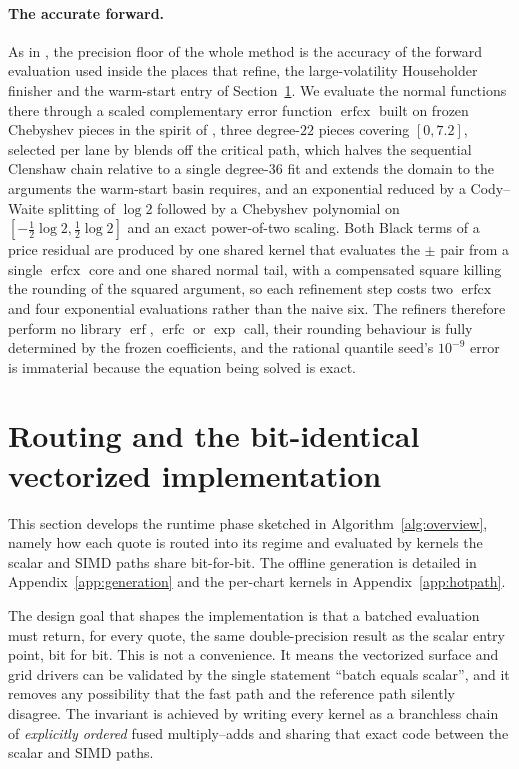 \documentclass[11pt]{article}
\newcommand{\erf}{\operatorname{erf}}
\newcommand{\erfc}{\operatorname{erfc}}
\newcommand{\erfcx}{\operatorname{erfcx}}
\begin{document}
\paragraph{The accurate forward.}
As in \citet{jackel2015rational}, the precision floor of the whole method is the accuracy of the forward evaluation used inside the places that refine, the large-volatility Householder finisher and the warm-start entry of Section~\ref{sec:simd}. We evaluate the normal functions there through a scaled complementary error function $\erfcx$ built on frozen Chebyshev pieces in the spirit of \citet{cody1969rational}, three degree-$22$ pieces covering $[0,7.2]$, selected per lane by blends off the critical path, which halves the sequential Clenshaw chain relative to a single degree-$36$ fit and extends the domain to the arguments the warm-start basin requires, and an exponential reduced by a Cody--Waite splitting of $\log2$ followed by a Chebyshev polynomial on $[-\tfrac12\log2,\tfrac12\log2]$ and an exact power-of-two scaling. Both Black terms of a price residual are produced by one shared kernel that evaluates the $\pm$ pair from a single $\erfcx$ core and one shared normal tail, with a compensated square killing the rounding of the squared argument, so each refinement step costs two $\erfcx$ and four exponential evaluations rather than the naive six. The refiners therefore perform no library $\erf$, $\erfc$ or $\exp$ call, their rounding behaviour is fully determined by the frozen coefficients, and the rational quantile seed's $10^{-9}$ error is immaterial because the equation being solved is exact.

\section{Routing and the bit-identical vectorized implementation}
\label{sec:simd}

This section develops the runtime phase sketched in Algorithm~\ref{alg:overview}, namely how each quote is routed into its regime and evaluated by kernels the scalar and SIMD paths share bit-for-bit. The offline generation is detailed in Appendix~\ref{app:generation} and the per-chart kernels in Appendix~\ref{app:hotpath}.

The design goal that shapes the implementation is that a batched evaluation must return, for every quote, the same double-precision result as the scalar entry point, bit for bit. This is not a convenience. It means the vectorized surface and grid drivers can be validated by the single statement ``batch equals scalar'', and it removes any possibility that the fast path and the reference path silently disagree. The invariant is achieved by writing every kernel as a branchless chain of \emph{explicitly ordered} fused multiply--adds and sharing that exact code between the scalar and SIMD paths.
\end{document}
